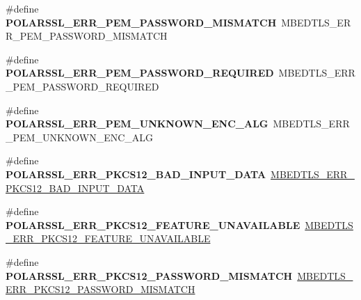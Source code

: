 \begin{DoxyCompactItemize}
\item 
\mbox{\label{compat-1_83_8h_aa950405345e1ae27eb5f7c91f3be1f04}} 
\#define {\bfseries P\+O\+L\+A\+R\+S\+S\+L\+\_\+\+E\+R\+R\+\_\+\+P\+E\+M\+\_\+\+P\+A\+S\+S\+W\+O\+R\+D\+\_\+\+M\+I\+S\+M\+A\+T\+CH}~M\+B\+E\+D\+T\+L\+S\+\_\+\+E\+R\+R\+\_\+\+P\+E\+M\+\_\+\+P\+A\+S\+S\+W\+O\+R\+D\+\_\+\+M\+I\+S\+M\+A\+T\+CH
\item 
\mbox{\label{compat-1_83_8h_afc5d820a2b2e902f0761de2172cc3ad4}} 
\#define {\bfseries P\+O\+L\+A\+R\+S\+S\+L\+\_\+\+E\+R\+R\+\_\+\+P\+E\+M\+\_\+\+P\+A\+S\+S\+W\+O\+R\+D\+\_\+\+R\+E\+Q\+U\+I\+R\+ED}~M\+B\+E\+D\+T\+L\+S\+\_\+\+E\+R\+R\+\_\+\+P\+E\+M\+\_\+\+P\+A\+S\+S\+W\+O\+R\+D\+\_\+\+R\+E\+Q\+U\+I\+R\+ED
\item 
\mbox{\label{compat-1_83_8h_a8094fdb48782e6b5ffeebc8912f94597}} 
\#define {\bfseries P\+O\+L\+A\+R\+S\+S\+L\+\_\+\+E\+R\+R\+\_\+\+P\+E\+M\+\_\+\+U\+N\+K\+N\+O\+W\+N\+\_\+\+E\+N\+C\+\_\+\+A\+LG}~M\+B\+E\+D\+T\+L\+S\+\_\+\+E\+R\+R\+\_\+\+P\+E\+M\+\_\+\+U\+N\+K\+N\+O\+W\+N\+\_\+\+E\+N\+C\+\_\+\+A\+LG
\item 
\mbox{\label{compat-1_83_8h_a0347624b3dbc3cbbb9bd7853247d2481}} 
\#define {\bfseries P\+O\+L\+A\+R\+S\+S\+L\+\_\+\+E\+R\+R\+\_\+\+P\+K\+C\+S12\+\_\+\+B\+A\+D\+\_\+\+I\+N\+P\+U\+T\+\_\+\+D\+A\+TA}~\mbox{\hyperlink{pkcs12_8h_ac856f81d3cbc3baeaa848b33d991209b}{M\+B\+E\+D\+T\+L\+S\+\_\+\+E\+R\+R\+\_\+\+P\+K\+C\+S12\+\_\+\+B\+A\+D\+\_\+\+I\+N\+P\+U\+T\+\_\+\+D\+A\+TA}}
\item 
\mbox{\label{compat-1_83_8h_a1f7e0b02bbbdbf57a8eaf833373a3532}} 
\#define {\bfseries P\+O\+L\+A\+R\+S\+S\+L\+\_\+\+E\+R\+R\+\_\+\+P\+K\+C\+S12\+\_\+\+F\+E\+A\+T\+U\+R\+E\+\_\+\+U\+N\+A\+V\+A\+I\+L\+A\+B\+LE}~\mbox{\hyperlink{pkcs12_8h_ae887e38a4caab392fc5086bcceed7af9}{M\+B\+E\+D\+T\+L\+S\+\_\+\+E\+R\+R\+\_\+\+P\+K\+C\+S12\+\_\+\+F\+E\+A\+T\+U\+R\+E\+\_\+\+U\+N\+A\+V\+A\+I\+L\+A\+B\+LE}}
\item 
\mbox{\label{compat-1_83_8h_ad616cb2d36ddaba56e5a2948ea7e667c}} 
\#define {\bfseries P\+O\+L\+A\+R\+S\+S\+L\+\_\+\+E\+R\+R\+\_\+\+P\+K\+C\+S12\+\_\+\+P\+A\+S\+S\+W\+O\+R\+D\+\_\+\+M\+I\+S\+M\+A\+T\+CH}~\mbox{\hyperlink{pkcs12_8h_ab3313f9e7321d23b3af93e97a544ffdb}{M\+B\+E\+D\+T\+L\+S\+\_\+\+E\+R\+R\+\_\+\+P\+K\+C\+S12\+\_\+\+P\+A\+S\+S\+W\+O\+R\+D\+\_\+\+M\+I\+S\+M\+A\+T\+CH}}

\end{DoxyCompactItemize}
